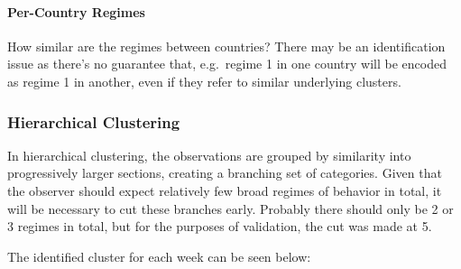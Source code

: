 \documentclass[]{article}
\let\oldparagraph\paragraph
\renewcommand{\paragraph}[1]{\oldparagraph{#1}\mbox{}}
\begin{document}
\paragraph{Per-Country Regimes}\label{per-country-regimes}

How similar are the regimes between countries? There may be an
identification issue as there's no guarantee that, e.g.~regime 1 in one
country will be encoded as regime 1 in another, even if they refer to
similar underlying clusters.

\subsubsection{Hierarchical Clustering}\label{hierarchical-clustering}

In hierarchical clustering, the observations are grouped by similarity
into progressively larger sections, creating a branching set of
categories. Given that the observer should expect relatively few broad
regimes of behavior in total, it will be necessary to cut these branches
early. Probably there should only be 2 or 3 regimes in total, but for
the purposes of validation, the cut was made at 5.

The identified cluster for each week can be seen below:
\end{document}
